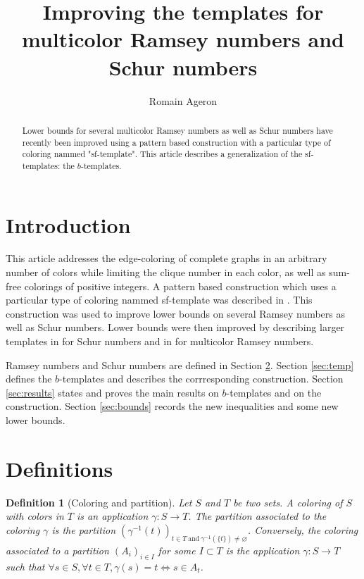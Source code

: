 \documentclass{article}
\title{Improving the templates for multicolor Ramsey numbers and Schur numbers}
\author{Romain Ageron}
\newtheorem{definition}{Definition}[section]
\begin{document}
\maketitle

\begin{abstract}
Lower bounds for several multicolor Ramsey numbers as well as Schur numbers have recently been improved using a 
pattern based construction with a particular type of coloring nammed "sf-template". This article describes a 
generalization of the sf-templates: the \(b\)-templates.
\end{abstract}

\section{Introduction}
This article addresses the edge-coloring of complete graphs in an arbitrary number of colors while limiting the clique 
number in each color, as well as sum-free colorings of positive integers. A pattern based construction which uses a 
particular type of coloring nammed sf-template was described in \cite{RowleyRamsey}. This construction was used to 
improve lower bounds on several Ramsey numbers as well as Schur numbers. Lower bounds were then improved by describing 
larger templates in \cite{schurboyz} for Schur numbers and in \cite{rowleyramseysat} for multicolor Ramsey numbers.

Ramsey numbers and Schur numbers are defined in Section \ref{sec:def}. Section \ref{sec:temp} defines the 
\(b\)-templates and describes the corrresponding construction. Section \ref{sec:results} states and proves the main 
results on \(b\)-templates and on the construction. Section \ref{sec:bounds} records the new inequalities and some new 
lower bounds.

\section{Definitions}
\label{sec:def}

\begin{definition}[Coloring and partition]
Let \(S\) and \(T\) be two sets. A coloring of \(S\) with colors in \(T\) is an application 
\(\gamma: S \rightarrow T\). The partition associated to the coloring \(\gamma\) is the partition 
\((\gamma^{-1}(t))_{t \in T ~\text{and}~ \gamma^{-1}(\{t\}) \neq \varnothing}\). Conversely, the coloring associated to 
a partition \((A_i)_{i \in I}\) for some \(I \subset T\) is the application \(\gamma: S \rightarrow T\) such that 
\(\forall s \in S, \forall t \in T, \gamma(s) = t \iff s \in A_t\).
\end{definition}
\end{document}
